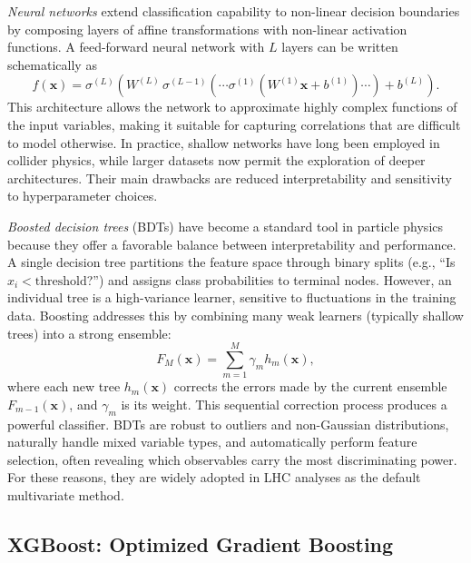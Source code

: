 \textit{Neural networks} extend classification capability to non-linear decision boundaries by composing layers of affine transformations with non-linear activation functions. A feed-forward neural network with $L$ layers can be written schematically as
\begin{equation}
f(\mathbf{x}) = \sigma^{(L)}\!\left(W^{(L)} \, \sigma^{(L-1)} \!\left( \cdots \sigma^{(1)}(W^{(1)} \mathbf{x} + b^{(1)}) \cdots \right) + b^{(L)} \right).
\end{equation}
This architecture allows the network to approximate highly complex functions of the input variables, making it suitable for capturing correlations that are difficult to model otherwise. In practice, shallow networks have long been employed in collider physics, while larger datasets now permit the exploration of deeper architectures. Their main drawbacks are reduced interpretability and sensitivity to hyperparameter choices.

\textit{Boosted decision trees} (BDTs) have become a standard tool in particle physics because they offer a favorable balance between interpretability and performance. A single decision tree partitions the feature space through binary splits (e.g., ``Is $x_i < \text{threshold}$?'') and assigns class probabilities to terminal nodes. However, an individual tree is a high-variance learner, sensitive to fluctuations in the training data. Boosting addresses this by combining many weak learners (typically shallow trees) into a strong ensemble:
\begin{equation}
F_M(\mathbf{x}) = \sum_{m=1}^{M} \gamma_m h_m(\mathbf{x}),
\end{equation}
where each new tree $h_m(\mathbf{x})$ corrects the errors made by the current ensemble $F_{m-1}(\mathbf{x})$, and $\gamma_m$ is its weight. This sequential correction process produces a powerful classifier. BDTs are robust to outliers and non-Gaussian distributions, naturally handle mixed variable types, and automatically perform feature selection, often revealing which observables carry the most discriminating power. For these reasons, they are widely adopted in LHC analyses as the default multivariate method.


\subsection{XGBoost: Optimized Gradient Boosting}
\label{ssec:xgboost}

